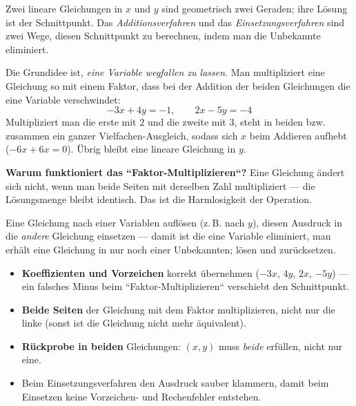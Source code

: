 


Zwei lineare Gleichungen in $x$ und $y$ sind geometrisch zwei Geraden; ihre
Lösung ist der Schnittpunkt. Das \emph{Additionsverfahren} und das
\emph{Einsetzungsverfahren} sind zwei Wege, diesen Schnittpunkt zu
berechnen, indem man die Unbekannte eliminiert.

\begin{werkzeugkasten}
Die Grundidee ist, \emph{eine Variable wegfallen zu lassen}. Man
multipliziert eine Gleichung so mit einem Faktor, dass bei der Addition
der beiden Gleichungen die eine Variable verschwindet:
\begin{equation}
  -3x+4y=-1,\qquad 2x-5y=-4
\end{equation}
Multipliziert man die erste mit $2$ und die zweite mit $3$, steht in beiden
bzw. zusammen ein ganzer Vielfachen-Ausgleich, sodass sich $x$ beim Addieren
aufhebt ($-6x+6x=0$). Übrig bleibt eine lineare Gleichung in $y$.

\textbf{Warum funktioniert das ``Faktor-Multiplizieren``?} Eine
Gleichung ändert sich nicht, wenn man beide Seiten mit derselben Zahl
multipliziert --- die Lösungsmenge bleibt identisch. Das ist die
Harmlosigkeit der Operation.
\end{werkzeugkasten}

\begin{werkzeugkasten}
Eine Gleichung nach einer Variablen auflösen (z.\,B. nach $y$), diesen
Ausdruck in die \emph{andere} Gleichung einsetzen --- damit ist die
eine Variable eliminiert, man erhält eine Gleichung in nur noch einer
Unbekannten; lösen und zurücksetzen.
\end{werkzeugkasten}

\begin{achtung}
\begin{itemize}
  \item \textbf{Koeffizienten und Vorzeichen} korrekt übernehmen
        ($-3x$, $4y$, $2x$, $-5y$) --- ein falsches Minus beim
        ``Faktor-Multiplizieren`` verschiebt den Schnittpunkt.
  \item \textbf{Beide Seiten} der Gleichung mit dem Faktor multiplizieren,
        nicht nur die linke (sonst ist die Gleichung nicht mehr
        äquivalent).
  \item \textbf{Rückprobe in beiden} Gleichungen: $(x,y)$ muss \emph{beide}
        erfüllen, nicht nur eine.
  \item Beim Einsetzungsverfahren den Ausdruck sauber klammern, damit beim
        Einsetzen keine Vorzeichen- und Rechenfehler entstehen.
\end{itemize}
\end{achtung}
